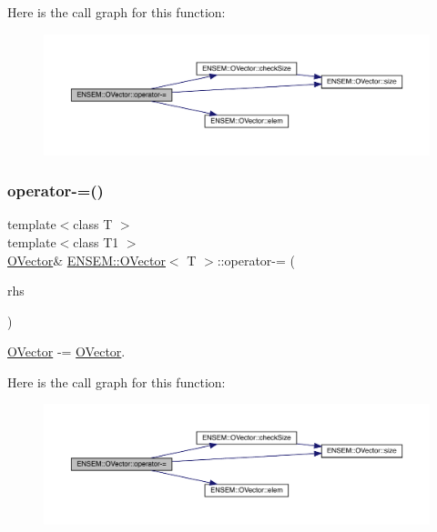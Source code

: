 Here is the call graph for this function\+:
\nopagebreak
\begin{figure}[H]
\begin{center}
\leavevmode
\includegraphics[width=350pt]{d0/d8d/classENSEM_1_1OVector_ae8a6c2f30368c6713325d05065aec425_cgraph}
\end{center}
\end{figure}
\mbox{\label{classENSEM_1_1OVector_ae8a6c2f30368c6713325d05065aec425}} 
\subsubsection{\texorpdfstring{operator-\/=()}{operator-=()}\hspace{0.1cm}{\footnotesize\ttfamily [4/4]}}
{\footnotesize\ttfamily template$<$class T $>$ \\
template$<$class T1 $>$ \\
\mbox{\hyperlink{classENSEM_1_1OVector}{O\+Vector}}\& \mbox{\hyperlink{classENSEM_1_1OVector}{E\+N\+S\+E\+M\+::\+O\+Vector}}$<$ T $>$\+::operator-\/= (\begin{DoxyParamCaption}\item[{const \mbox{\hyperlink{classENSEM_1_1OVector}{O\+Vector}}$<$ T1 $>$ \&}]{rhs }\end{DoxyParamCaption})\hspace{0.3cm}{\ttfamily [inline]}}



\mbox{\hyperlink{classENSEM_1_1OVector}{O\+Vector}} -\/= \mbox{\hyperlink{classENSEM_1_1OVector}{O\+Vector}}. 

Here is the call graph for this function\+:
\nopagebreak
\begin{figure}[H]
\begin{center}
\leavevmode
\includegraphics[width=350pt]{d0/d8d/classENSEM_1_1OVector_ae8a6c2f30368c6713325d05065aec425_cgraph}
\end{center}
\end{figure}
\mbox{\label{classENSEM_1_1OVector_aa26be39a0620d0cdc1685bc2f1cc31a5}} 
